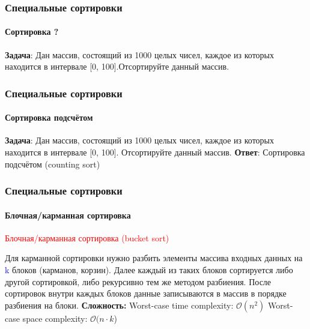 \documentclass[aspectratio=169]{beamer}
\begin{document}
\begin{frame}
\frametitle{Специальные сортировки}
\framesubtitle{Сортировка ?}
\justifying
\textbf{Задача}:\newline
Дан массив, состоящий из 1000 целых чисел, каждое из которых находится в интервале [0, 100].\newline\newline Отсортируйте данный массив.
\end{frame}

\begin{frame}
\frametitle{Специальные сортировки}
\framesubtitle{Сортировка подсчётом}
\justifying
\textbf{Задача}:\newline
Дан массив, состоящий из 1000 целых чисел, каждое из которых находится в интервале [0, 100]. Отсортируйте данный массив.\newline\newline
\textbf{Ответ}: Сортировка подсчётом (counting sort)
\begin{figure}
    \captionsetup[subfigure]{labelformat=empty}
    \centering
\end{figure}
\end{frame}

\begin{frame}
\frametitle{Специальные сортировки}
\framesubtitle{Блочная/карманная сортировка}
\justifying
\textcolor{red}{Блочная/карманная сортировка (bucket sort)}

Для карманной сортировки нужно разбить элементы массива входных данных на \textcolor{blue}{k} блоков (карманов, корзин). Далее каждый из таких блоков сортируется либо другой сортировкой, либо рекурсивно тем же методом разбиения. После сортировок внутри каждых блоков данные записываются в массив в порядке разбиения на блоки.\newline\newline
\textbf{Сложность:}\newline
Worst-case time complexity: $\mathcal{O}(n^2)$ \newline
Worst-case space complexity: $\mathcal{O}(n\cdot k$)\newline
\end{frame}
\end{document}
